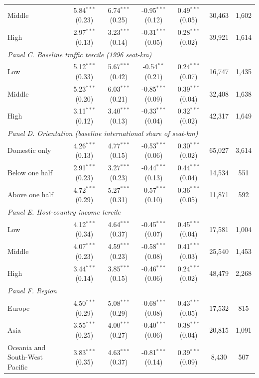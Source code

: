 \documentclass[12pt]{extarticle}
\begin{document}
\begin{table}[H]
{\begin{threeparttable}
\begin{tabular}{lcccccc}
  Middle & 5.84$^{***}$ (0.23) & 6.74$^{***}$ (0.25) & -0.95$^{***}$ (0.12) & 0.49$^{***}$ (0.05) & 30,463 & 1,602 \\
  High & 2.97$^{***}$ (0.13) & 3.23$^{***}$ (0.14) & -0.31$^{***}$ (0.05) & 0.28$^{***}$ (0.02) & 39,921 & 1,614 \\
\multicolumn{7}{l}{\textit{Panel C. Baseline traffic tercile (1996 seat-km)}} \\
  Low & 5.12$^{***}$ (0.33) & 5.67$^{***}$ (0.42) & -0.54$^{**}$ (0.21) & 0.24$^{***}$ (0.07) & 16,747 & 1,435 \\
  Middle & 5.23$^{***}$ (0.20) & 6.03$^{***}$ (0.21) & -0.85$^{***}$ (0.09) & 0.39$^{***}$ (0.04) & 32,408 & 1,638 \\
  High & 3.11$^{***}$ (0.12) & 3.40$^{***}$ (0.13) & -0.33$^{***}$ (0.04) & 0.32$^{***}$ (0.02) & 42,317 & 1,649 \\
\multicolumn{7}{l}{\textit{Panel D. Orientation (baseline international share of seat-km)}} \\
  Domestic only & 4.26$^{***}$ (0.13) & 4.77$^{***}$ (0.15) & -0.53$^{***}$ (0.06) & 0.30$^{***}$ (0.02) & 65,027 & 3,614 \\
  Below one half & 2.91$^{***}$ (0.23) & 3.27$^{***}$ (0.23) & -0.44$^{***}$ (0.13) & 0.44$^{***}$ (0.04) & 14,534 & 551 \\
  Above one half & 4.72$^{***}$ (0.29) & 5.27$^{***}$ (0.31) & -0.57$^{***}$ (0.10) & 0.36$^{***}$ (0.05) & 11,871 & 592 \\
\multicolumn{7}{l}{\textit{Panel E. Host-country income tercile}} \\
  Low & 4.12$^{***}$ (0.34) & 4.64$^{***}$ (0.37) & -0.45$^{***}$ (0.07) & 0.45$^{***}$ (0.04) & 17,581 & 1,004 \\
  Middle & 4.07$^{***}$ (0.23) & 4.59$^{***}$ (0.23) & -0.58$^{***}$ (0.08) & 0.41$^{***}$ (0.03) & 25,540 & 1,453 \\
  High & 3.44$^{***}$ (0.14) & 3.85$^{***}$ (0.15) & -0.46$^{***}$ (0.06) & 0.24$^{***}$ (0.02) & 48,479 & 2,268 \\
\multicolumn{7}{l}{\textit{Panel F. Region}} \\
  Europe & 4.50$^{***}$ (0.29) & 5.08$^{***}$ (0.29) & -0.68$^{***}$ (0.08) & 0.43$^{***}$ (0.05) & 17,532 & 815 \\
  Asia & 3.55$^{***}$ (0.25) & 4.00$^{***}$ (0.27) & -0.40$^{***}$ (0.06) & 0.38$^{***}$ (0.04) & 20,815 & 1,091 \\
  Oceania and South-West Pacific & 3.83$^{***}$ (0.35) & 4.63$^{***}$ (0.37) & -0.81$^{***}$ (0.14) & 0.39$^{***}$ (0.09) & 8,430 & 507 \\

\end{tabular}
\end{threeparttable}}
\end{table}
\end{document}

